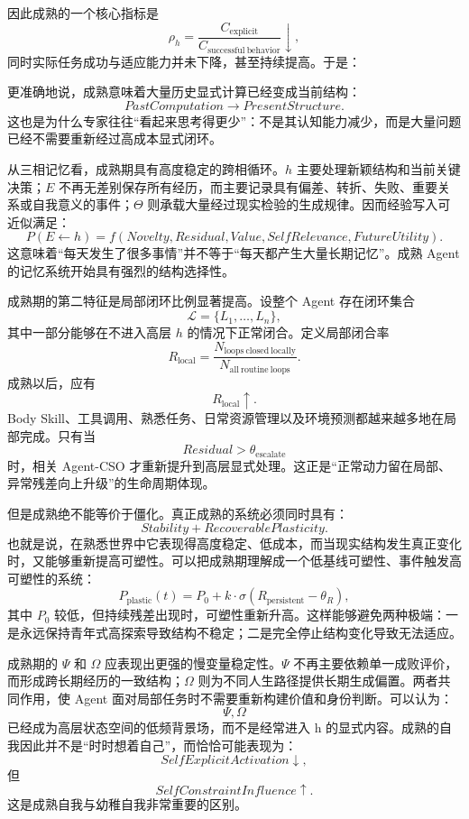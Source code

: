 因此成熟的一个核心指标是
\[
\rho_h
=
\frac{
C_{\mathrm{explicit}}
}{
C_{\mathrm{successful\ behavior}}
}
\downarrow,
\]
同时实际任务成功与适应能力并未下降，甚至持续提高。于是：
\begin{statementbox}
\centering
{}
\end{statementbox}
更准确地说，成熟意味着大量历史显式计算已经变成当前结构：
\[
PastComputation
\rightarrow
PresentStructure.
\]
这也是为什么专家往往“看起来思考得更少”：不是其认知能力减少，而是大量问题已经不需要重新经过高成本显式闭环。

从三相记忆看，成熟期具有高度稳定的跨相循环。$h$ 主要处理新颖结构和当前关键决策；$E$ 不再无差别保存所有经历，而主要记录具有偏差、转折、失败、重要关系或自我意义的事件；$\Theta$ 则承载大量经过现实检验的生成规律。因而经验写入可近似满足：
\[
P(E\leftarrow h)
=
f(
Novelty,
Residual,
Value,
SelfRelevance,
FutureUtility
).
\]
这意味着“每天发生了很多事情”并不等于“每天都产生大量长期记忆”。成熟 Agent 的记忆系统开始具有强烈的结构选择性。

成熟期的第二特征是局部闭环比例显著提高。设整个 Agent 存在闭环集合
\[
\mathcal L
=
\{
L_1,\ldots,L_n
\},
\]
其中一部分能够在不进入高层 $h$ 的情况下正常闭合。定义局部闭合率
\[
R_{\mathrm{local}}
=
\frac{
N_{\mathrm{loops\ closed\ locally}}
}{
N_{\mathrm{all\ routine\ loops}}
}.
\]
成熟以后，应有
\[
R_{\mathrm{local}}\uparrow.
\]
Body Skill、工具调用、熟悉任务、日常资源管理以及环境预测都越来越多地在局部完成。只有当
\[
Residual>\theta_{\mathrm{escalate}}
\]
时，相关 Agent-CSO 才重新提升到高层显式处理。这正是“正常动力留在局部、异常残差向上升级”的生命周期体现。

但是成熟绝不能等价于僵化。真正成熟的系统必须同时具有：
\[
Stability
+
RecoverablePlasticity.
\]
也就是说，在熟悉世界中它表现得高度稳定、低成本，而当现实结构发生真正变化时，又能够重新提高可塑性。可以把成熟期理解成一个低基线可塑性、事件触发高可塑性的系统：
\[
P_{\mathrm{plastic}}(t)
=
P_0
+
k
\cdot
\sigma
\left(
R_{\mathrm{persistent}}-\theta_R
\right),
\]
其中 $P_0$ 较低，但持续残差出现时，可塑性重新升高。这样能够避免两种极端：一是永远保持青年式高探索导致结构不稳定；二是完全停止结构变化导致无法适应。

成熟期的 $\Psi$ 和 $\Omega$ 应表现出更强的慢变量稳定性。$\Psi$ 不再主要依赖单一成败评价，而形成跨长期经历的一致结构；$\Omega$ 则为不同人生路径提供长期生成偏置。两者共同作用，使 Agent 面对局部任务时不需要重新构建价值和身份判断。可以认为：
\[
\Psi,\Omega
\]
已经成为高层状态空间的低频背景场，而不是经常进入 h 的显式内容。成熟的自我因此并不是“时时想着自己”，而恰恰可能表现为：
\[
SelfExplicitActivation
\downarrow,
\]
但
\[
SelfConstraintInfluence
\uparrow.
\]
这是成熟自我与幼稚自我非常重要的区别。


